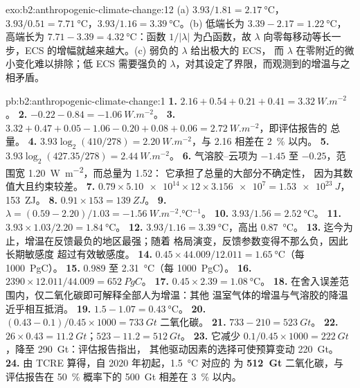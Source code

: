 \begin{solution}{exo:b2:anthropogenic-climate-change:12}
(a) $3.93/1.81 = \qty{2.17}{\celsius}$，$3.93/0.51 = \qty{7.71}{\celsius}$，$3.93/1.16 =
\qty{3.39}{\celsius}$。(b) 低端长为 $3.39 - 2.17 = \qty{1.22}{\celsius}$，高端长为
$7.71 - 3.39 = \qty{4.32}{\celsius}$：函数 $1/|\lambda|$ 为凸函数，故
$\lambda$ 向零每移动等长一步，ECS 的增幅就越来越大。(c) 弱负的 $\lambda$ 给出极大的 ECS，
而 $\lambda$ 在零附近的微小变化难以排除；低 ECS 需要强负的
$\lambda$，对其设定了界限，而观测到的增温与之相矛盾。
\end{solution}

\begin{solution}{pb:b2:anthropogenic-climate-change:1}
\textbf{1.} $2.16 + 0.54 + 0.21 + 0.41 = \qty{3.32}{W.m^{-2}}$。
\textbf{2.} $-0.22 - 0.84 = \qty{-1.06}{W.m^{-2}}$。
\textbf{3.} $3.32 + 0.47 + 0.05 - 1.06 - 0.20 + 0.08 + 0.06 = \qty{2.72}{W.m^{-2}}$，即评估报告的
总量。
\textbf{4.} $3.93\log_2(410/278) = \qty{2.20}{W.m^{-2}}$，与 2.16 相差在 \qty{2}{\percent} 以内。
\textbf{5.} $3.93\log_2(427.35/278) = \qty{2.44}{W.m^{-2}}$。
\textbf{6.} 气溶胶–云项为 $-1.45$ 至 $-0.25$，范围宽 \qty{1.20}{W.m^{-2}}，而总量为 1.52：
它承担了总量的大部分不确定性，
因为其数值大且约束较差。
\textbf{7.} $0.79 \times \num{5.10e14} \times 12 \times \num{3.156e7} = \qty{1.53e23}{J}$，
\qty{153}{ZJ}。
\textbf{8.} $0.91 \times 153 = \qty{139}{ZJ}$。
\textbf{9.} $\lambda = (0.59 - 2.20)/1.03 = \qty{-1.56}{W.m^{-2}.\celsius^{-1}}$。
\textbf{10.} $3.93/1.56 = \qty{2.52}{\celsius}$。
\textbf{11.} $3.93 \times 1.03/2.20 = \qty{1.84}{\celsius}$。
\textbf{12.} $3.93/1.16 = \qty{3.39}{\celsius}$，高出 \qty{0.87}{\celsius}。
\textbf{13.} 迄今为止，增温在反馈最负的地区最强；随着
格局演变，反馈参数变得不那么负，因此长期敏感度
超过有效敏感度。
\textbf{14.} $0.45 \times 44.009/12.011 = \qty{1.65}{\celsius}$（每 \qty{1000}{PgC}）。
\textbf{15.} 0.989 至 \qty{2.31}{\celsius}（每 \qty{1000}{PgC}）。
\textbf{16.} $2390 \times 12.011/44.009 = \qty{652}{PgC}$。
\textbf{17.} $0.45 \times 2.39 = \qty{1.08}{\celsius}$。
\textbf{18.} 在舍入误差范围内，仅二氧化碳即可解释全部人为增温：其他
温室气体的增温与气溶胶的降温近乎相互抵消。
\textbf{19.} $1.5 - 1.07 = \qty{0.43}{\celsius}$。
\textbf{20.} $(0.43 - 0.1)/0.45 \times 1000 = \qty{733}{Gt}$ 二氧化碳。
\textbf{21.} $733 - 210 = \qty{523}{Gt}$。
\textbf{22.} $26 \times 0.43 = \qty{11.2}{Gt}$；$523 - 11.2 = \qty{512}{Gt}$。
\textbf{23.} 它减少 $0.1/0.45 \times 1000 = \qty{222}{Gt}$，降至 \qty{290}{Gt}：评估报告指出，
其他驱动因素的选择可使预算变动 \qty{220}{Gt}。
\textbf{24.} 由 TCRE 算得，自 2020 年初起，\qty{1.5}{\celsius} 对应的
为 \textbf{\qty[text-series-to-math=true]{512}{Gt}} 二氧化碳，与
评估报告在 \qty{50}{\percent} 概率下的 \qty{500}{Gt} 相差在 \qty{3}{\percent} 以内。
\end{solution}
